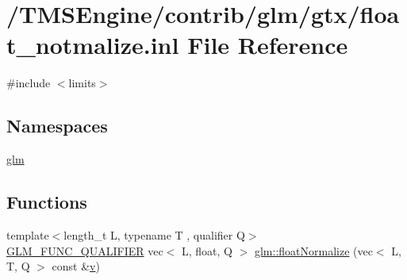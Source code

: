 \hypertarget{float__notmalize_8inl}{}\section{/\+T\+M\+S\+Engine/contrib/glm/gtx/float\+\_\+notmalize.inl File Reference}
\label{float__notmalize_8inl}
{\ttfamily \#include $<$limits$>$}\newline
\subsection*{Namespaces}
\begin{DoxyCompactItemize}
\item 
 \hyperlink{namespaceglm}{glm}
\end{DoxyCompactItemize}
\subsection*{Functions}
\begin{DoxyCompactItemize}
\item 
{\footnotesize template$<$length\+\_\+t L, typename T , qualifier Q$>$ }\\\hyperlink{setup_8hpp_a33fdea6f91c5f834105f7415e2a64407}{G\+L\+M\+\_\+\+F\+U\+N\+C\+\_\+\+Q\+U\+A\+L\+I\+F\+I\+ER} vec$<$ L, float, Q $>$ \hyperlink{namespaceglm_abe353196ef510a000c1c6b74d27db1e1}{glm\+::float\+Normalize} (vec$<$ L, T, Q $>$ const \&\hyperlink{_s_d_l__opengl_8h_a10a82eabcb59d2fcd74acee063775f90}{v})
\end{DoxyCompactItemize}
